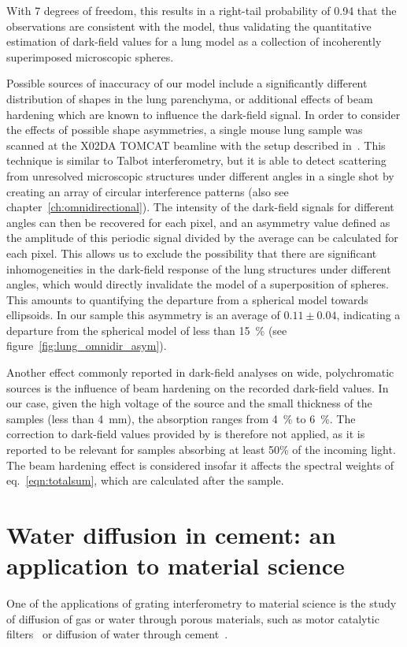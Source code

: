 With 7 degrees of freedom, this results in a right-tail probability of 0.94 that the 
observations are consistent with the model, thus validating the quantitative estimation of
dark-field values for a lung model as a collection of incoherently
superimposed microscopic spheres.

Possible sources of inaccuracy of our model include a significantly
different distribution of shapes in the lung parenchyma, or additional
effects of beam hardening which are known to influence the dark-field
signal. In order to consider the effects of possible shape asymmetries, a
single mouse lung sample was scanned at the X02DA TOMCAT beamline with the
setup described in~\cite{PhysRevLett.116.093902}. This
technique is similar to Talbot interferometry, but it is able to detect
scattering from unresolved microscopic structures under different angles in
a single shot by
creating an array of circular interference patterns (also see
chapter~\ref{ch:omnidirectional}). The intensity of the
dark-field signals for different angles can then be recovered for each
pixel, and an asymmetry value defined as the amplitude of this periodic
signal divided by the average can be calculated for each pixel. This allows
us to exclude the possibility that there are significant inhomogeneities in
the dark-field response of the lung structures under different angles, which
would directly invalidate the model of a superposition of spheres. This
amounts to quantifying the departure from a spherical model towards
ellipsoids. In our sample this asymmetry is an average of $0.11 \pm 0.04$,
indicating a departure from the spherical model of less
than \SI{15}{\percent} (see figure~\ref{fig:lung_omnidir_asym}).

Another effect commonly reported in dark-field analyses on wide, polychromatic
sources is the influence of beam hardening on the recorded dark-field
values. In our case, given the high voltage of the source and the small
thickness of the samples (less than \SI{4}{\milli\meter}), the absorption
ranges from \SI{4}{\percent} to \SI{6}{\percent}. The correction to
dark-field values provided by \cite{Yashiro:15} is therefore
not applied, as it is reported to be relevant for samples absorbing at least
50\% of the incoming light. The beam hardening effect is considered insofar
it affects the spectral weights of eq.~\ref{eqn:totalsum}, which are calculated
after the sample. 

\section{Water diffusion in cement: an application to material science}
One of the applications of grating interferometry to material science is the
study of diffusion of gas or water through porous materials, such as motor
catalytic filters~\parencite{doi:10.1021/cs3004006} or diffusion of water through cement~\parencite{20.500.11850/268}.

